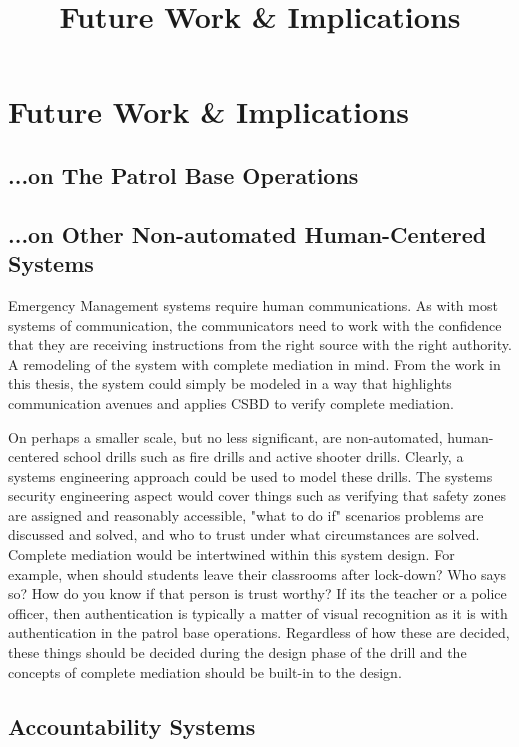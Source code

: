 \documentclass[../../main/main.tex]{subfiles}
\begin{document}
\title{Future Work \& Implications}
\chapter{Future Work \& Implications}\label{chp:future}

\section{...on The Patrol Base Operations}\label{sec:onpb}


\section{...on Other Non-automated Human-Centered Systems}\label{sec:accountability}
Emergency Management systems require human communications.  As with most systems of communication, the communicators need to work with the confidence that they are receiving instructions from the right source with the right authority.  A remodeling of the system with complete mediation in mind.  From the work in this thesis, the system could simply be modeled in a way that highlights communication avenues and applies CSBD to verify complete mediation.

On perhaps a smaller scale, but no less significant, are non-automated, human-centered school drills such as fire drills and active shooter drills.  Clearly, a systems engineering approach could be used to model these drills.  The systems security engineering aspect would cover things such as verifying that safety zones are assigned and reasonably accessible, "what to do if" scenarios problems are discussed and solved, and who to trust under what circumstances are solved.  Complete mediation would be intertwined within this system design.  For example, when should students leave their classrooms after lock-down?  Who says so?  How do you know if that person is trust worthy?  If its the teacher or a police officer, then authentication is typically a matter of visual recognition as it is with authentication in the patrol base operations.  Regardless of how these are decided, these things should be decided during the design phase of the drill and the concepts of complete mediation should be built-in to the design.

      
\section{Accountability Systems}\label{sec:accountability}
\end{document}
